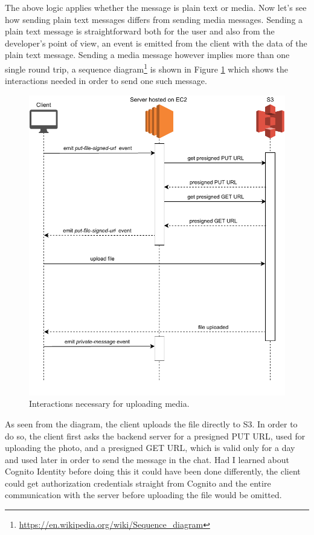 The above logic applies whether the message is plain text or media. Now let's see how sending plain text messages differs from sending media messages. Sending a plain text message is straightforward both for the user and also from the developer's point of view, an event is emitted from the client with the data of the plain text message. Sending a media message however implies more than one single round trip, a sequence diagram\footnote{\href{https://en.wikipedia.org/wiki/Sequence\_diagram}{https://en.wikipedia.org/wiki/Sequence\_diagram}} is shown in Figure \ref{figure:backend-stage-server-media-message} which shows the interactions needed in order to send one such message.

\begin{figure}[H]
	\centering
	\includegraphics[width=\textwidth,keepaspectratio]{images/backend/upload-media.pdf}
	\caption{Interactions necessary for uploading media.}
	\label{figure:backend-stage-server-media-message}
\end{figure}

As seen from the diagram, the client uploads the file directly to S3. In order to do so, the client first asks the backend server for a presigned PUT URL, used for uploading the photo, and a presigned GET URL, which is valid only for a day and used later in order to send the message in the chat. Had I learned about Cognito Identity before doing this it could have been done differently, the client could get authorization credentials straight from Cognito and the entire communication with the server before uploading the file would be omitted.


